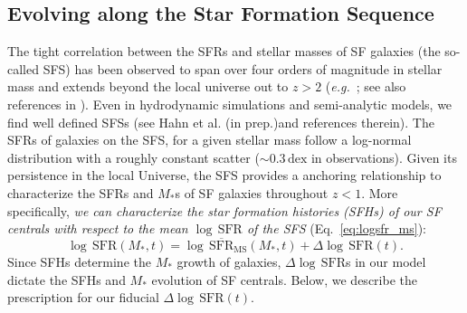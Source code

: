 \documentclass[12pt, letterpaper, preprint]{aastex}
\newcommand{\beq}{\begin{equation}}
\newcommand{\eeq}{\end{equation}}
\newcommand{\logsfr}{\log \, \mathrm{SFR}}
\newcommand{\hahngmm}{Hahn et al. (in prep.)}
\begin{document}
\subsection{Evolving along the Star Formation Sequence} \label{sec:modelevol} 
The tight correlation between the SFRs and stellar masses of SF 
galaxies (the so-called SFS) has been observed to span over four 
orders of magnitude in stellar mass and extends beyond the local 
universe out to $z > 2$ 
(\emph{e.g.}~\citealt{noeske2007,daddi2007,elbaz2007,salim2007,santini2009,karim2011,whitaker2012,moustakas2013,lee2015}; see also references in \citealt{speagle2014}). 
Even in hydrodynamic simulations and semi-analytic models, we find 
well defined SFSs (see \hahngmm and references therein). The SFRs 
of galaxies on the SFS, for a given stellar mass follow a log-normal 
distribution with a roughly constant scatter ($\sim0.3\,\mathrm{dex}$ 
in observations).  %
Given its persistence in the local Universe, the SFS provides a 
anchoring relationship to characterize the SFRs and $M_*$s of SF 
galaxies throughout $z < 1$. More specifically, \emph{we can characterize 
the star formation histories (SFHs) of our SF centrals with respect 
to the mean $\logsfr$ of the SFS} (Eq.~\ref{eq:logsfr_ms}):
\beq \label{eq:logsfr_sf} 
\logsfr(M_*, t) = \log\,\overline{\mathrm{SFR}}_\mathrm{MS}(M_*, t) + \Delta \logsfr(t).
\eeq
Since SFHs determine the $M_*$ growth of galaxies, $\Delta \logsfr$s
in our model dictate the SFHs and $M_*$ evolution of SF centrals. 
Below, we describe the prescription for our fiducial $\Delta \logsfr(t)$.
\end{document}
